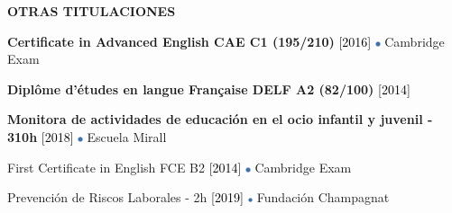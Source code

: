 \documentclass[../main.tex]{subfiles}
\begin{document}
    \vspace*{0.5cm}
    \textbf{\textcolor{myCV2}{OTRAS TITULACIONES\underline{\hspace{5.05cm}}}}
        \vspace*{0.3cm}
        
        \textbf{Certificate in Advanced English CAE C1 (195/210)}
        \textcolor{black}{[2016]}
        \includegraphics[width=0.15cm]{assets/blue.png} 
        Cambridge Exam
        
        \vspace*{0.25cm}
        \textbf{Diplôme d'études en langue Française DELF A2 (82/100)} 
        \textcolor{black}{[2014]}
        
        \vspace*{0.25cm}
        \textbf{Monitora de actividades de educación en el ocio infantil y juvenil - 310h}
        \textcolor{black}{[2018]}
        \includegraphics[width=0.15cm]{assets/blue.png} 
        Escuela Mirall
        
        \vspace*{0.25cm}
        First Certificate in English FCE B2
        \textcolor{black}{[2014]}
        \includegraphics[width=0.15cm]{assets/blue.png} 
        Cambridge Exam 

        \vspace*{0.25cm}
        Prevención de Riscos Laborales - 2h
        \textcolor{black}{[2019]}
        \includegraphics[width=0.15cm]{assets/blue.png}
        Fundación Champagnat

\end{document}
